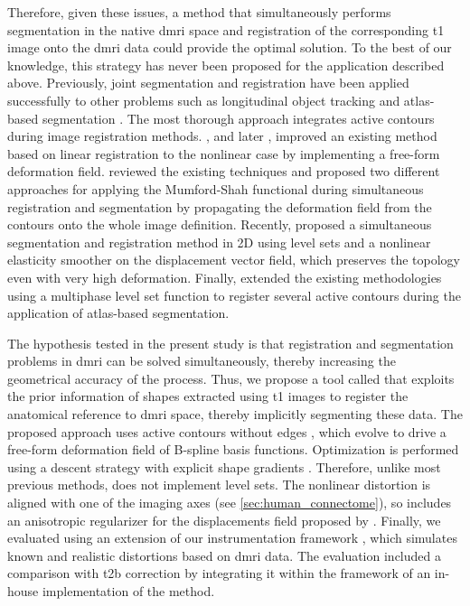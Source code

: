 Therefore, given these issues, a method that simultaneously performs
  segmentation in the native \gls*{dmri} space and registration of the corresponding \gls*{t1} image
  onto the \gls*{dmri} data could provide the optimal solution.
To the best of our knowledge, this strategy has never been proposed for the application described above.
Previously, joint segmentation and registration have been applied successfully to other problems
such as longitudinal object tracking \citep{paragios_level_2003} and atlas-based
  segmentation \citep{gorthi_active_2011}.
The most thorough approach integrates active contours during image registration
  methods.
\cite{unal_coupled_2005}, and later \cite{wang_joint_2006},
  improved an existing method \citep{yezzi_variational_2003} based on linear registration
  to the nonlinear case by implementing a free-form deformation field.
\cite{droske_mumfordshah_2009} reviewed the existing techniques and proposed two different
  approaches for applying the Mumford-Shah functional \citep{mumford_optimal_1989} during simultaneous
  registration and segmentation by propagating the deformation field from
  the contours onto the whole image definition.
Recently, \cite{guyader_combined_2011} proposed a simultaneous segmentation and
  registration method in 2D using level sets and a nonlinear elasticity smoother on the
  displacement vector field, which preserves the topology even with very high deformation.
Finally, \cite{gorthi_active_2011} extended the existing methodologies using a multiphase
  level set function to register several active contours during the application
  of atlas-based segmentation.

The hypothesis tested in the present study is that registration and segmentation
  problems in \gls*{dmri} can be solved simultaneously, thereby increasing the geometrical
  accuracy of the process.
Thus, we propose a tool called \regseg{} that exploits the prior information of shapes
  extracted using \gls*{t1} images to register the anatomical reference
  to \gls*{dmri} space, thereby implicitly segmenting these data.
The proposed approach uses active contours without edges \citep{chan_active_2001}, which evolve to drive a
  free-form deformation field of B-spline basis functions.
Optimization is performed using a descent strategy with explicit shape gradients
  \citep{besson_dream2s_2003,herbulot_segmentation_2006}.
Therefore, unlike most previous methods, \regseg{} does not implement level sets.
The nonlinear distortion is aligned with one of the imaging axes (see
  \autoref{sec:human_connectome}), so \regseg{} includes an anisotropic regularizer for
  the displacements field proposed by \cite{nagel_investigation_1986}.
Finally, we evaluated \regseg{} using an extension of our instrumentation framework
  \citep{esteban_simulationbased_2014}, which simulates known and realistic distortions
  based on \gls*{dmri} data.
The evaluation included a comparison with \gls*{t2b} correction by integrating it within the framework
  of an in-house implementation of the method.
